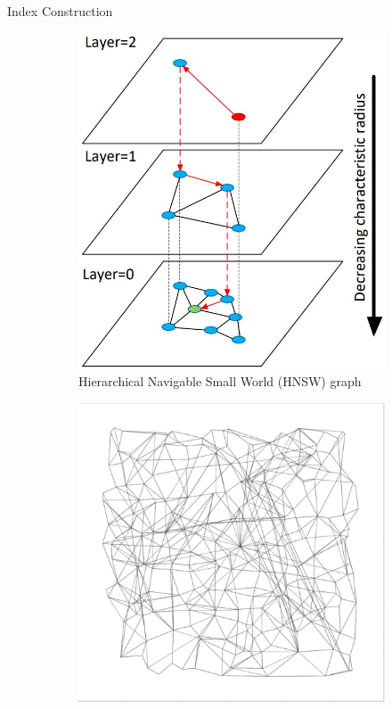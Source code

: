 \begin{frame}{Index Construction}
    \begin{figure}[ht]
        \centering
        \hfill
        \begin{subfigure}{0.49\textwidth}
            \centering
            \includegraphics[height=0.6\textheight]{images/hnsw}
            \caption{Hierarchical Navigable Small World (HNSW) graph}
        \end{subfigure}
        \hfill
        \begin{subfigure}{0.49\textwidth}
            \centering
            \includegraphics[height=0.6\textheight]{images/diskann}

\end{subfigure}
\end{figure}
\end{frame}
